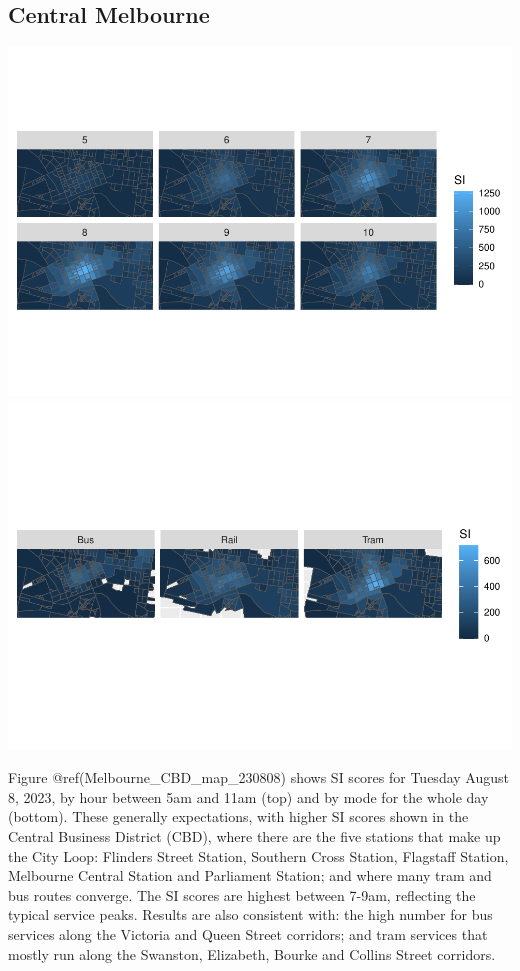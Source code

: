 \documentclass[preprint, 3p,
authoryear]{elsarticle} %
\begin{document}
\hypertarget{central-melbourne}{%
\subsection{Central Melbourne}\label{central-melbourne}}

\includegraphics{Leveraging_GTFS_to_assess_transit_supply_Transport_Geography_files/figure-latex/Melbourne_CBD_map_230808-1.pdf}
\includegraphics{Leveraging_GTFS_to_assess_transit_supply_Transport_Geography_files/figure-latex/Melbourne_CBD_map_230808-2.pdf}

Figure @ref(Melbourne\_CBD\_map\_230808) shows SI scores for Tuesday
August 8, 2023, by hour between 5am and 11am (top) and by mode for the
whole day (bottom). These generally expectations, with higher SI scores
shown in the Central Business District (CBD), where there are the five
stations that make up the City Loop: Flinders Street Station, Southern
Cross Station, Flagstaff Station, Melbourne Central Station and
Parliament Station; and where many tram and bus routes converge. The SI
scores are highest between 7-9am, reflecting the typical service peaks.
Results are also consistent with: the high number for bus services along
the Victoria and Queen Street corridors; and tram services that mostly
run along the Swanston, Elizabeth, Bourke and Collins Street corridors.
\end{document}
